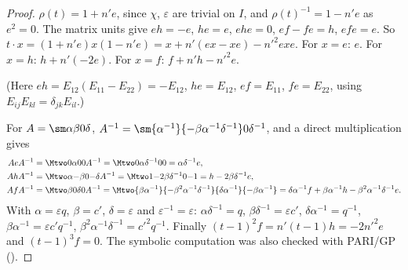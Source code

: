 \begin{proof}
$\rho(t)=1+n'e$, since $\chi$, $\varepsilon$ are trivial on $I$, and $\rho(t)^{-1}=1-n'e$ as $e^2=0$. The matrix units give $eh=-e$, $he=e$, $ehe=0$, $ef-fe=h$, $efe=e$.
So $t\cdot x=(1+n'e)x(1-n'e)=x+n'(ex-xe)-n'^2exe$. For $x=e$: $e$. For $x=h$: $h+n'(-2e)$. For $x=f$: $f+n'h-n'^2e$.

(Here $eh=E_{12}(E_{11}-E_{22})=-E_{12}$, $he=E_{12}$, $ef=E_{11}$, $fe=E_{22}$, using $E_{ij}E_{kl}=\delta_{jk}E_{il}$.)

For $A=\sm\alpha\beta0\delta$, $A^{-1}=\sm{\alpha^{-1}}{-\beta\alpha^{-1}\delta^{-1}}0{\delta^{-1}}$, and a direct multiplication gives
\begin{align*}
AeA^{-1}&=\Mtwo0\alpha00A^{-1}=\Mtwo0{\alpha\delta^{-1}}00=\alpha\delta^{-1}e,\\
AhA^{-1}&=\Mtwo\alpha{-\beta}0{-\delta}A^{-1}=\Mtwo1{-2\beta\delta^{-1}}0{-1}=h-2\beta\delta^{-1}e,\\
AfA^{-1}&=\Mtwo\beta0\delta0A^{-1}=\Mtwo{\beta\alpha^{-1}}{-\beta^2\alpha^{-1}\delta^{-1}}{\delta\alpha^{-1}}{-\beta\alpha^{-1}}=\delta\alpha^{-1}f+\beta\alpha^{-1}h-\beta^2\alpha^{-1}\delta^{-1}e.
\end{align*} With $\alpha=\varepsilon q$, $\beta=c'$, $\delta=\varepsilon$ and $\varepsilon^{-1}=\varepsilon$:
$\alpha\delta^{-1}=q$, $\beta\delta^{-1}=\varepsilon c'$, $\delta\alpha^{-1}=q^{-1}$, $\beta\alpha^{-1}=\varepsilon c'q^{-1}$, $\beta^2\alpha^{-1}\delta^{-1}=c'^2q^{-1}$. Finally
$(t-1)^2f=n'(t-1)h=-2n'^2e$ and $(t-1)^3f=0$. The symbolic computation was also checked with PARI/GP ().
\end{proof}

